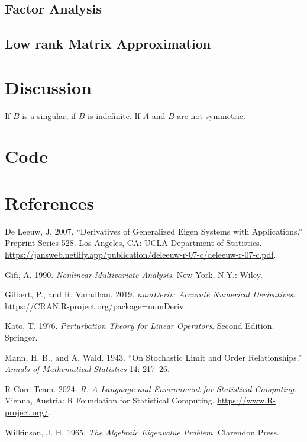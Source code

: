 \documentclass[
  12pt,
  letterpaper,
  DIV=11,
  numbers=noendperiod]{scrartcl}
\newlength{\cslhangindent}
\newenvironment{CSLReferences}[2] %
 {\begin{list}{}{%
  \setlength{\itemindent}{0pt}
  \setlength{\leftmargin}{0pt}
  \setlength{\parsep}{0pt}
  \ifodd #1
   \setlength{\leftmargin}{\cslhangindent}
   \setlength{\itemindent}{-1\cslhangindent}
  \fi
  \setlength{\itemsep}{#2\baselineskip}}}
 {\end{list}}
\begin{document}
\subsection{Factor Analysis}\label{sec-fa}

\subsection{Low rank Matrix Approximation}\label{sec-rank}

\section{Discussion}\label{sec-discussion}

If \(B\) is a singular, if \(B\) is indefinite. If \(A\) and \(B\) are
not symmetric.

\section{Code}\label{sec-code}

\section*{References}\label{sec-references}

\label{refs}
\begin{CSLReferences}{1}{0}
De Leeuw, J. 2007. {``Derivatives of Generalized Eigen Systems with
Applications.''} Preprint Series 528. Los Angeles, CA: UCLA Department
of Statistics.
\url{https://jansweb.netlify.app/publication/deleeuw-r-07-c/deleeuw-r-07-c.pdf}.

Gifi, A. 1990. \emph{Nonlinear Multivariate Analysis}. New York, N.Y.:
Wiley.

Gilbert, P., and R. Varadhan. 2019. \emph{{numDeriv: Accurate Numerical
Derivatives}}. \url{https://CRAN.R-project.org/package=numDeriv}.

Kato, T. 1976. \emph{Perturbation Theory for Linear Operators}. Second
Edition. Springer.

Mann, H. B., and A. Wald. 1943. {``{On Stochastic Limit and Order
Relationships}.''} \emph{Annals of Mathematical Statistics} 14: 217--26.

R Core Team. 2024. \emph{R: A Language and Environment for Statistical
Computing}. {Vienna, Austria}: R Foundation for Statistical Computing.
\url{https://www.R-project.org/}.

Wilkinson, J. H. 1965. \emph{{The Algebraic Eigenvalue Problem}}.
Clarendon Press.

\end{CSLReferences}
\end{document}
